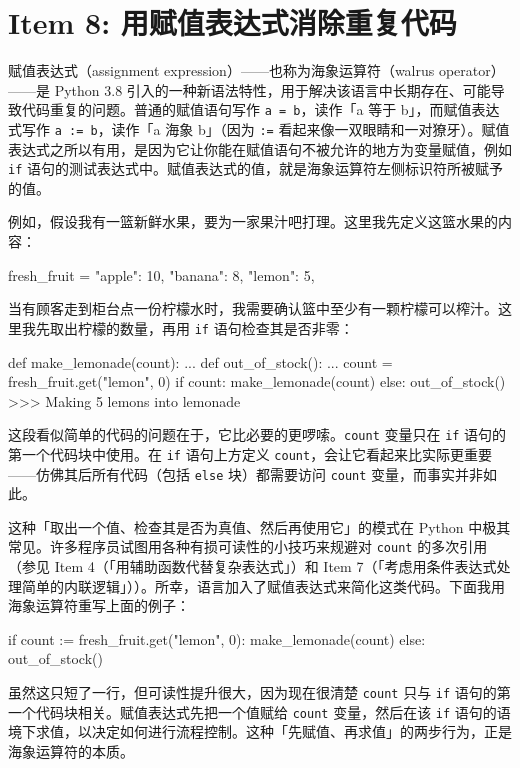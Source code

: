 \section{Item 8: 用赋值表达式消除重复代码}

赋值表达式（assignment expression）——也称为海象运算符（walrus operator）——是 Python 3.8 引入的一种新语法特性，用于解决该语言中长期存在、可能导致代码重复的问题。普通的赋值语句写作 \texttt{a = b}，读作「a 等于 b」，而赋值表达式写作 \texttt{a := b}，读作「a 海象 b」（因为 \texttt{:=} 看起来像一双眼睛和一对獠牙）。赋值表达式之所以有用，是因为它让你能在赋值语句不被允许的地方为变量赋值，例如 \texttt{if} 语句的测试表达式中。赋值表达式的值，就是海象运算符左侧标识符所被赋予的值。

例如，假设我有一篮新鲜水果，要为一家果汁吧打理。这里我先定义这篮水果的内容：

\begin{codebox}[python]
fresh_fruit = {
    "apple": 10,
    "banana": 8,
    "lemon": 5,
}
\end{codebox}

当有顾客走到柜台点一份柠檬水时，我需要确认篮中至少有一颗柠檬可以榨汁。这里我先取出柠檬的数量，再用 \texttt{if} 语句检查其是否非零：

\begin{codebox}[python]
def make_lemonade(count):
    ...
def out_of_stock():
    ...
count = fresh_fruit.get("lemon", 0)
if count:
    make_lemonade(count)
else:
    out_of_stock()
>>>
Making 5 lemons into lemonade
\end{codebox}

这段看似简单的代码的问题在于，它比必要的更啰嗦。\texttt{count} 变量只在 \texttt{if} 语句的第一个代码块中使用。在 \texttt{if} 语句上方定义 \texttt{count}，会让它看起来比实际更重要——仿佛其后所有代码（包括 \texttt{else} 块）都需要访问 \texttt{count} 变量，而事实并非如此。

这种「取出一个值、检查其是否为真值、然后再使用它」的模式在 Python 中极其常见。许多程序员试图用各种有损可读性的小技巧来规避对 \texttt{count} 的多次引用（参见 Item 4（「用辅助函数代替复杂表达式」）和 Item 7（「考虑用条件表达式处理简单的内联逻辑」））。所幸，语言加入了赋值表达式来简化这类代码。下面我用海象运算符重写上面的例子：

\begin{codebox}[python]
if count := fresh_fruit.get("lemon", 0):
    make_lemonade(count)
else:
    out_of_stock()
\end{codebox}

虽然这只短了一行，但可读性提升很大，因为现在很清楚 \texttt{count} 只与 \texttt{if} 语句的第一个代码块相关。赋值表达式先把一个值赋给 \texttt{count} 变量，然后在该 \texttt{if} 语句的语境下求值，以决定如何进行流程控制。这种「先赋值、再求值」的两步行为，正是海象运算符的本质。

